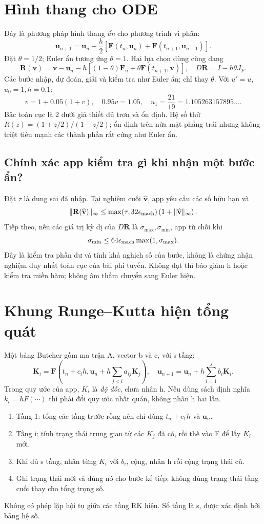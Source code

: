 \section{Hình thang cho ODE}
\label{sec:ode-trapezoid}
Đây là phương pháp hình thang \emph{ẩn} cho phương trình vi phân:
\[
\mathbf u_{n+1}=\mathbf u_n+\frac h2\left[
\mathbf F(t_n,\mathbf u_n)+\mathbf F(t_{n+1},\mathbf u_{n+1})\right].
\]
Đặt $\theta=1/2$; Euler ẩn tương ứng $\theta=1$. Hai lựa chọn dùng cùng dạng
\[
\mathbf R(\mathbf v)=\mathbf v-\mathbf u_n-h[(1-\theta)\mathbf F_n+
\theta\mathbf F(t_{n+1},\mathbf v)],\quad
D\mathbf R=I-h\theta J_F.
\]
Các bước nhập, dự đoán, giải và kiểm tra như Euler ẩn; chỉ thay $\theta$. Với $u'=u$, $u_0=1,h=0.1$:
\[
v=1+0.05(1+v),\quad0.95v=1.05,
\quad u_1=\frac{21}{19}=1.105263157895\ldots.
\]
Bậc toàn cục là 2 dưới giả thiết đủ trơn và ổn định. Hệ số thử $R(z)=(1+z/2)/(1-z/2)$; ổn định trên nửa mặt phẳng trái nhưng không triệt tiêu mạnh các thành phần rất cứng như Euler ẩn.

\subsection{Chính xác app kiểm tra gì khi nhận một bước ẩn?}
Đặt $\tau$ là dung sai đã nhập. Tại nghiệm cuối $\widehat{\mathbf v}$, app yêu cầu các số hữu hạn và
\[
\|\mathbf R(\widehat{\mathbf v})\|_\infty
\le\max(\tau,32\epsilon_{\rm mach})\left(1+\|\widehat{\mathbf v}\|_\infty\right).
\]
Tiếp theo, nếu các giá trị kỳ dị của $D\mathbf R$ là $\sigma_{\max},\sigma_{\min}$, app từ chối khi
\[
\sigma_{\min}\le64\epsilon_{\rm mach}\max(1,\sigma_{\max}).
\]
Đây là kiểm tra phần dư và tính khả nghịch số của bước, không là chứng nhận nghiệm duy nhất toàn cục của bài phi tuyến. Không đạt thì báo giảm h hoặc kiểm tra miền hàm; không âm thầm chuyển sang Euler hiện.

\section{Khung Runge--Kutta hiện tổng quát}
\label{sec:ode-rk-general}
Một bảng Butcher gồm ma trận A, vector b và c, với s tầng:
\[
\mathbf K_i=\mathbf F\left(t_n+c_i h,
\mathbf u_n+h\sum_{j<i}a_{ij}\mathbf K_j\right),\quad
\mathbf u_{n+1}=\mathbf u_n+h\sum_{i=1}^{s}b_i\mathbf K_i.
\]
Trong quy ước của app, $K_i$ là \emph{độ dốc}, chưa nhân h. Nếu dùng sách định nghĩa $k_i=hF(\cdots)$ thì phải đổi quy ước nhất quán, không nhân h hai lần.
\begin{enumerate}
\item Tầng 1: tổng các tầng trước rỗng nên chỉ dùng $t_n+c_1h$ và $\mathbf u_n$.
\item Tầng i: tính trạng thái trung gian từ các $K_j$ đã có, rồi thế vào F để lấy $K_i$ mới.
\item Khi đủ s tầng, nhân từng $K_i$ với $b_i$, cộng, nhân h rồi cộng trạng thái cũ.
\item Ghi trạng thái mới và dùng nó cho bước kế tiếp; không dùng trạng thái tầng cuối thay cho tổng trọng số.
\end{enumerate}
Không có phép lặp hội tụ giữa các tầng RK hiện. Số tầng là s, được xác định bởi bảng hệ số.

